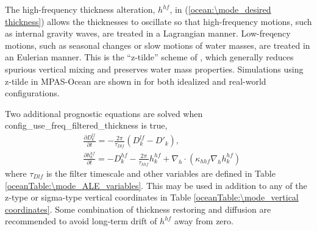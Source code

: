 The high-frequency thickness alteration, $h^{hf}$, in (\ref{ocean:\mode_desired thickness}) allows the thicknesses to oscillate so that high-frequency motions, such as internal gravity waves, are treated in a Lagrangian manner.  Low-freqency motions, such as seasonal changes or slow motions of water masses, are treated in an Eulerian manner.  This is the ``z-tilde'' scheme of \citet{Leclair_Madec11om}, which generally reduces spurious vertical mixing and preserves water mass properties.  Simulations using z-tilde in MPAS-Ocean are shown in \citet{Petersen_ea14om} for both idealized and real-world configurations.  

Two additional prognostic equations are solved when config\_use\_freq\_filtered\_thickness is true,
\begin{eqnarray}
\label{ocean:\mode_Dlf}
 & \displaystyle
  \frac{\partial D^{lf}_k}{\partial t} = - \frac{2\pi}{\tau_{Dlf}} \left( D^{lf}_k - D'_k \right), 
\\ & \displaystyle
\label{ocean:\mode_hhf}
\frac{\partial h^{hf}_k}{\partial t} =  - D^{hf}_k - \frac{2\pi}{\tau_{hhf}} h^{hf}_k + \nabla_h\cdot \left( \kappa_{hhf} \nabla_h h^{hf}_k \right) 
\end{eqnarray}
where $\tau_{Dlf}$ is the filter timescale and other variables are defined in Table \ref{oceanTable:\mode_ALE_variables}.  This may be used in addition to any of the z-type or sigma-type vertical coordinates in Table \ref{oceanTable:\mode_vertical coordinates}.  Some combination of thickness restoring and diffusion are recommended to avoid long-term drift of $h^{hf}$ away from zero.



